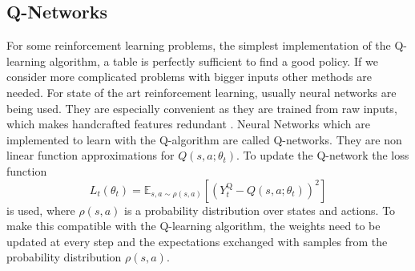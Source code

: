 \subsection{Q-Networks}
For some reinforcement learning problems, the simplest implementation of the Q-learning algorithm, a table is perfectly sufficient to find a good policy.
If we consider more complicated problems with bigger inputs other methods are needed. For state of the art reinforcement learning, usually neural networks are being used.
They are especially convenient as they are trained from raw inputs, which makes handcrafted features redundant \cite{DBLP:journals/corr/MnihKSGAWR13}.
Neural Networks which are implemented to learn with the Q-algorithm are called Q-networks.
They are non linear function approximations for $Q(s,a;\theta_t)$.
To update the Q-network the loss function
\begin{equation}
L_{t}\left(\theta_{t}\right)=\mathbb{E}_{s, a \sim \rho(s,a)}\left[\left(Y_{t}^{\mathrm{Q}}-Q\left(s, a ; \theta_{t}\right)\right)^{2}\right]
\end{equation}
is used, where $\rho(s, a)$ is a probability distribution over states and actions. To make this compatible with the Q-learning algorithm, the weights need to be updated at every step and the expectations exchanged with samples from the probability distribution $\rho(s,a)$.
